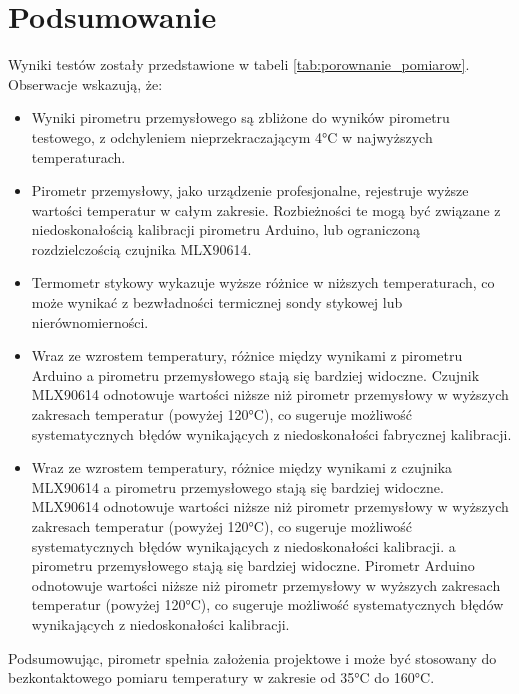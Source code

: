 \chapter{Podsumowanie}

Wyniki testów zostały przedstawione w tabeli \ref{tab:porownanie_pomiarow}. Obserwacje wskazują, że:
\begin{itemize}
\item Wyniki pirometru przemysłowego są zbliżone do wyników pirometru testowego, z odchyleniem nieprzekraczającym 4°C w najwyższych temperaturach.
\item Pirometr przemysłowy, jako urządzenie profesjonalne, rejestruje wyższe wartości
temperatur w całym zakresie. Rozbieżności te mogą być związane z niedoskonałością
kalibracji pirometru Arduino, lub ograniczoną rozdzielczością czujnika MLX90614.
\item Termometr stykowy wykazuje wyższe różnice w niższych temperaturach, co
może wynikać z bezwładności termicznej sondy stykowej lub nierównomierności.\item Wraz ze wzrostem temperatury, różnice między wynikami z pirometru Arduino
a pirometru przemysłowego stają się bardziej widoczne. Czujnik MLX90614
odnotowuje wartości niższe niż pirometr przemysłowy w wyższych zakresach
temperatur (powyżej 120°C), co sugeruje możliwość systematycznych błędów
wynikających z niedoskonałości fabrycznej kalibracji. \item Wraz ze wzrostem temperatury, różnice między wynikami z czujnika MLX90614 a pirometru przemysłowego stają się bardziej widoczne. MLX90614
odnotowuje wartości niższe niż pirometr przemysłowy w wyższych zakresach
temperatur (powyżej 120°C), co sugeruje możliwość systematycznych błędów
wynikających z niedoskonałości kalibracji.
a pirometru przemysłowego stają się bardziej widoczne. Pirometr Arduino
odnotowuje wartości niższe niż pirometr przemysłowy w wyższych zakresach
temperatur (powyżej 120°C), co sugeruje możliwość systematycznych błędów
wynikających z niedoskonałości kalibracji.
\end{itemize}

Podsumowując, pirometr spełnia założenia projektowe i może być stosowany do bezkontaktowego pomiaru temperatury w zakresie od 35°C do 160°C.

